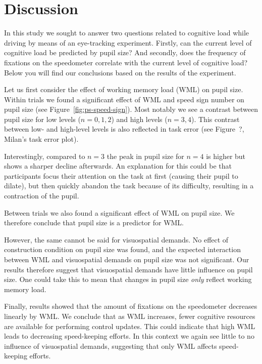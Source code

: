 
\section{Discussion}\label{sec:discussion}
In this study we sought to answer two questions related to cognitive load while driving by means of an eye-tracking experiment.
Firstly, can the current level of cognitive load be predicted by pupil size? 
And secondly, does the frequency of fixations on the speedometer correlate with the current level of cognitive load?
Below you will find our conclusions based on the results of the experiment.

Let us first consider the effect of working memory load (WML) on pupil size.
Within trials we found a significant effect of WML and speed sign number on pupil size (see Figure~\ref{fig:ps-speed-sign}).
Most notably we see a contrast between pupil size for low \nback levels (\(n = 0,1,2\)) and high \nback levels (\(n = 3,4\)). 
This contrast between low- and high-level \nback levels is also reflected in task error (see Figure~?, Milan's task error plot). 

Interestingly, compared to \(n = 3\) the peak in pupil size for \(n = 4\) is higher but shows a sharper decline afterwards.
An explanation for this could be that participants focus their attention on the task at first (causing their pupil to dilate), but then quickly abandon the task because of its difficulty, resulting in a contraction of the pupil.

Between trials we also found a significant effect of WML on pupil size. 
We therefore conclude that pupil size is a predictor for WML.\@

However, the same cannot be said for visuospatial demands. No effect of construction condition on pupil size was found, and the expected interaction between WML and visuospatial demands on pupil size was not significant.
Our results therefore suggest that visuospatial demands have little influence on pupil size.
One could take this to mean that changes in pupil size \textit{only} reflect working memory load.

Finally, results showed that the amount of fixations on the speedometer decreases linearly by WML.\@
We conclude that as WML increases, fewer cognitive resources are available for performing control updates.
This could indicate that high WML leads to decreasing speed-keeping efforts.
In this context we again see little to no influence of visuospatial demands, suggesting that only WML affects speed-keeping efforts.

